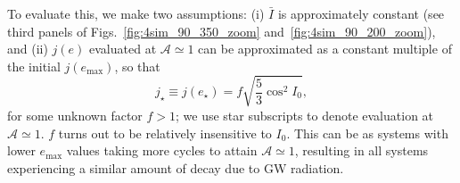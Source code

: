 \documentclass[
        twocolumn,
        twocolappendix
    ]{aastex63}
\begin{document}
To evaluate this, we make two assumptions: (i) $\bar{I}$ is approximately
constant (see third panels of Figs.~\ref{fig:4sim_90_350_zoom}
and~\ref{fig:4sim_90_200_zoom}), and (ii) $j(e)$ evaluated at $\mathcal{A}
\simeq 1$ can be approximated as a constant multiple of the initial
$j(e_{\max})$, so that
\begin{equation}
    j_{\star} \equiv j(e_{\star}) = f
        \sqrt{\frac{5}{3}\cos^2 I_0},\label{eq:jstar_ansatz}
\end{equation}
for some unknown factor $f > 1$; we use star subscripts to denote evaluation at
$\mathcal{A} \simeq 1$. $f$ turns out to be relatively insensitive to $I_0$.
This can be as systems with lower $e_{\max}$ values taking more cycles to attain
$\mathcal{A} \simeq 1$, resulting in all systems experiencing a similar amount
of decay due to GW radiation.
\end{document}

